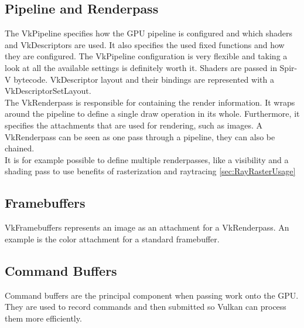 \subsection{Pipeline and Renderpass}
\label{sec:VkPipeline}
The VkPipeline specifies how the GPU pipeline is configured and which shaders and VkDescriptors are used. It also specifies the used fixed functions and how they are configured. The VkPipeline configuration is very flexible and taking a look at all the available settings is definitely worth it. Shaders are passed in Spir-V bytecode. VkDescriptor layout and their bindings are represented with a VkDescriptorSetLayout.\\
The VkRenderpass is responsible for containing the render information. It wraps around the pipeline to define a single draw operation in its whole. Furthermore, it specifies the attachments that are used for rendering, such as images. A VkRenderpass can be seen as one pass through a pipeline, they can also be chained.\\
It is for example possible to define multiple renderpasses, like a visibility and a shading pass to use benefits of rasterization and raytracing \ref{sec:RayRasterUsage}
\subsection{Framebuffers}
\label{sec:VkFramebuffer}
VkFramebuffers represents an image as an attachment for a VkRenderpass. An example is the color attachment for a standard framebuffer.
\subsection{Command Buffers}
\label{sec:VkCommandbuffer}
Command buffers are the principal component when passing work onto the GPU. They are used to record commands and then submitted so Vulkan can process them more efficiently.
